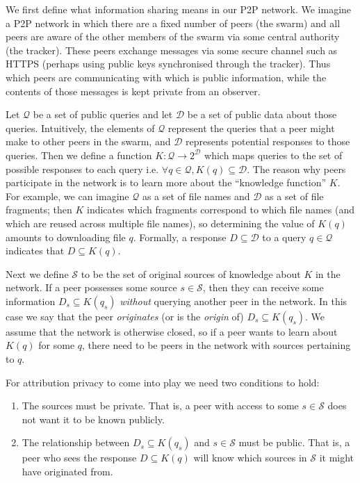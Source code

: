 \documentclass{article}
\begin{document}
We first define what information sharing means in our P2P network. We
imagine a P2P network in which there are a fixed number of peers (the
swarm) and all peers are aware of the other members of the swarm via some
central authority (the tracker). These peers exchange messages via some secure
channel such as HTTPS (perhaps using public keys synchronised through the
tracker). Thus which peers are communicating with which is public information,
while the contents of those messages is kept private from an observer.

Let $\mathcal{Q}$ be a set of public queries and let $\mathcal{D}$ be a set of
public data about those queries. Intuitively, the elements of $\mathcal{Q}$
represent the queries that a peer might make to other peers in the swarm, and
$\mathcal{D}$ represents potential responses to those queries. Then we define a
function $K:\mathcal{Q}\rightarrow 2^\mathcal{D}$ which maps queries to the set
of possible responses to each query i.e. $\forall q\in\mathcal{Q},
K(q)\subseteq\mathcal{D}$. The reason why peers participate in the network is to
learn more about the ``knowledge function'' $K$. For example, we can imagine
$\mathcal{Q}$ as a set of file names and $\mathcal{D}$ as a set of file
fragments; then $K$ indicates which fragments correspond to which file names (and
which are reused across multiple file names), so determining the value of $K(q)$
amounts to downloading file $q$. Formally, a response $D\subseteq\mathcal{D}$ to
a query $q\in\mathcal{Q}$ indicates that $D\subseteq K(q)$.

Next we define $\mathcal{S}$ to be the set of original sources of knowledge
about $K$ in the network. If a peer possesses some source $s\in\mathcal{S}$,
then they can receive some information $D_s\subseteq K(q_s)$ {\it without}
querying another peer in the network. In this case we say that the peer {\it
originates} (or is the {\it origin} of) $D_s\subseteq K(q_s)$. We assume that
the network is otherwise closed, so if a peer wants to learn about $K(q)$ for
some $q$, there need to be peers in the network with sources pertaining to $q$.

For attribution privacy to come into play we need two conditions to hold:
\begin{enumerate}
	\item The sources must be private. That is, a peer with access to some
		$s\in\mathcal{S}$ does not want it to be known publicly.
	\item The relationship between $D_s\subseteq K(q_s)$ and $s\in\mathcal{S}$
		must be public. That is, a peer who sees the response $D\subseteq K(q)$
		will know which sources in $\mathcal{S}$ it might have originated from.
\end{enumerate}
\end{document}
